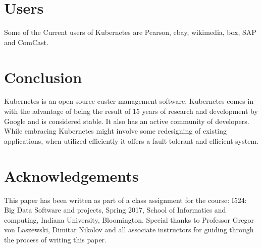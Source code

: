 \documentclass[9pt,twocolumn,twoside]{styles/osajnl}
\begin{document}
\section{Users}
Some of the Current users of Kubernetes are Pearson, ebay, wikimedia, box, SAP and ComCast.\cite{www-kubernetesusers}
\section{Conclusion}
Kubernetes is an open source custer management software. Kubernetes comes in with the advantage of being the result of 15 years of research and development by Google and is considered stable. It also has an active community of developers. While embracing Kubernetes might involve some redesigning of existing applications, when utilized efficiently it offers a fault-tolerant and efficient system.



\section*{Acknowledgements}

This paper has been written as part of a class assignment for the course: 
I524: Big Data Software and projects, Spring 2017, School of Informatics and computing, Indiana University, Bloomington.
Special thanks to Professor Gregor von Laszewski, Dimitar Nikolov and all associate instructors for guiding through the process of writing this paper.




 
\end{document}
